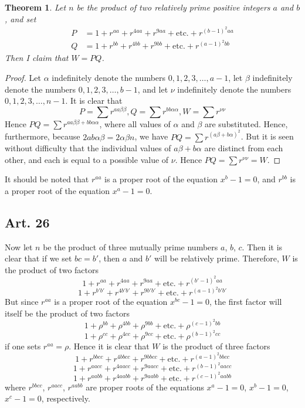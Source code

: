 \documentclass{book}
\theoremstyle{plain}
\newtheorem*{theorem}{Theorem}
\theoremstyle{remark}
\begin{document}
\begin{theorem} Let $n$ be the product of two relatively prime positive integers $a$ and $b$, and set
\begin{align*} P &= 1 + r^{aa} + r^{4aa} + r^{9aa} + \textrm{etc.} + r^{(b-1)^2aa} \\
Q&= 1+r^{bb} + r^{4bb} + r^{9bb} + \textrm{etc.} + r^{(a-1)^2bb} \end{align*}
Then I claim that $W = PQ$. 
\end{theorem}
\begin{proof} Let $\alpha$ indefinitely denote the numbers $0,1,2,3,\dots,a-1$, let $\beta$ indefinitely denote the numbers $0,1,2,3,\dots,b-1$, and let $\nu$ indefinitely denote the numbers $0,1,2,3,\dots,n-1$.  It is clear that
\[ P = \sum r^{aa\beta\beta} , Q = \sum r^{bb\alpha\alpha}, W = \sum r^{\nu\nu} \]
Hence $PQ = \sum r^{aa\beta\beta + bb \alpha\alpha}$, where all values of $\alpha$ and $\beta$ are substituted.  Hence, furthermore, because $2ab\alpha\beta = 2\alpha\beta n$, we have $PQ = \sum r^{(a\beta+b\alpha)^2}$.  But it is seen without difficulty that the individual values of $a\beta+b\alpha$ are distinct from each other, and each is equal to a possible value of $\nu$.  Hence $PQ = \sum r^{\nu\nu} = W$. \end{proof}

It should be noted that $r^{aa}$ is a proper root of the equation $x^b-1 = 0$, and $r^{bb}$ is a proper root of the equation $x^a-1=0$. 

\subsection*{Art. 26} 

Now let $n$ be the product of three mutually prime numbers $a$, $b$, $c$.  Then it is clear that if we set $bc = b'$, then $a$ and $b'$ will be relatively prime.  Therefore, $W$ is the product of two factors 
\[ 1 + r^{aa} + r^{4aa} + r^{9aa} + \textrm{etc.} + r^{(b'-1)^2aa} \]
\[ 1 + r^{b'b'} + r^{4b'b'} + r^{9b'b'} + \textrm{etc.} + r^{(a-1)^2b'b'} \]
But since $r^{aa}$ is a proper root of the equation $x^{bc}-1=0$, the first factor will itself be the product of two factors
\[ 1 + \rho^{bb} + \rho^{4bb} + \rho^{9bb} + \textrm{etc.} + \rho^{(c-1)^2bb} \]
\[ 1 + \rho^{cc} + \rho^{4cc} + \rho^{9cc} + \textrm{etc.} + \rho^{(b-1)^2cc} \]
if one sets $r^{aa} = \rho$.  Hence it is clear that $W$ is the product of three factors
\[ 1 + r^{bbcc} + r^{4bbcc} + r^{9bbcc} + \textrm{etc.} + r^{(a-1)^2bbcc} \]
\[ 1 + r^{aacc} + r^{4aacc} + r^{9aacc} + \textrm{etc.} + r^{(b-1)^2aacc} \]
\[ 1 + r^{aabb} + r^{4aabb} + r^{9aabb} + \textrm{etc.} + r^{(c-1)^2aabb} \]
where $r^{bbcc}$, $r^{aacc}$, $r^{aabb}$ are proper roots of the equations $x^a-1=0$, $x^b-1=0$, $x^c-1=0$, respectively.
\end{document}

